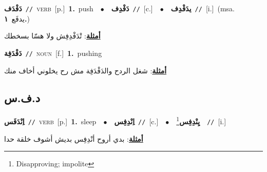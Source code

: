 \documentclass[10pt,a4paper,twoside]{article} %
\begin{document}
\begin{multicols}{2}
{\setlength\topsep{0pt}\textbf{\foreignlanguage{arabic}{دَفْدَف}}\ {\color{gray}\texttt{//}\color{black}}\ \textsc{verb}\ [p.]\ \textbf{1.}~push\ \ $\bullet$\ \ \setlength\topsep{0pt}\textbf{\foreignlanguage{arabic}{دَفْدِف}}\ {\color{gray}\texttt{//}\color{black}}\ [c.]\ \ $\bullet$\ \ \setlength\topsep{0pt}\textbf{\foreignlanguage{arabic}{يدَفْدِف}}\ {\color{gray}\texttt{//}\color{black}}\ [i.]\ \color{gray}(msa. \foreignlanguage{arabic}{يدفَع}~\foreignlanguage{arabic}{\textbf{١.}})\color{black}\  \begin{flushright}\color{gray}\foreignlanguage{arabic}{\textbf{\underline{\foreignlanguage{arabic}{أمثلة}}}: تْدَفْدِفِش ولا هسّا بسخطك}\end{flushright}\color{black}} \vspace{2mm}

{\setlength\topsep{0pt}\textbf{\foreignlanguage{arabic}{دَفْدَفِة}}\ {\color{gray}\texttt{//}\color{black}}\ \textsc{noun}\ [f.]\ \textbf{1.}~pushing\  \begin{flushright}\color{gray}\foreignlanguage{arabic}{\textbf{\underline{\foreignlanguage{arabic}{أمثلة}}}: شغل الردح والدَفْدَفِة مش رح يخلوني أخاف منك}\end{flushright}\color{black}} \vspace{2mm}

\vspace{-3mm}
\subsection*{\color{blue}\foreignlanguage{arabic}{د.ف.س}\color{blue}{}} 

{\setlength\topsep{0pt}\textbf{\foreignlanguage{arabic}{اِنْدَفَس}}\ {\color{gray}\texttt{//}\color{black}}\ \textsc{verb}\ [p.]\ \textbf{1.}~sleep\ \ $\bullet$\ \ \setlength\topsep{0pt}\textbf{\foreignlanguage{arabic}{اِنْدِفِس}}\ {\color{gray}\texttt{//}\color{black}}\ [c.]\ \ $\bullet$\ \ \setlength\topsep{0pt}\textbf{\foreignlanguage{arabic}{يِنْدِفِس}}\footnote{Disapproving; impolite}\ \ {\color{gray}\texttt{//}\color{black}}\ [i.]\  \begin{flushright}\color{gray}\foreignlanguage{arabic}{\textbf{\underline{\foreignlanguage{arabic}{أمثلة}}}: بدي أروح أنْدِفِس بديش أشوف خلقة حدا}\end{flushright}\color{black}} \vspace{2mm}


\end{multicols}
\end{document}
